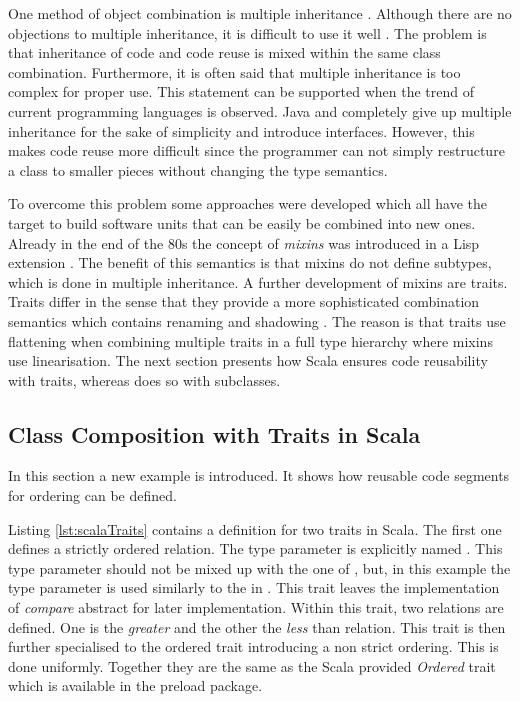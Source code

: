 One method of object combination is multiple inheritance
\cite{taivalsaari_notion_1996}. Although there are no objections
to multiple inheritance, it is difficult to use it well
\cite{wegner_panel_1987}. The problem is that inheritance of code
and code reuse is mixed within the same class combination. Furthermore,
it is often said that multiple inheritance is too complex for proper use.
This statement can be supported when the trend of current programming languages
is observed. Java and \cs completely give up multiple inheritance for
the sake of simplicity and introduce interfaces. However, this makes
code reuse more difficult since the programmer can not simply restructure
a class to smaller pieces without changing the type semantics.

To overcome this problem some approaches were developed which
all have the target to build software units that can be easily be
combined into new ones. Already in the end of the 80s the concept of
\emph{mixins} was introduced
in a Lisp extension \cite{moon_object-oriented_1986}. The benefit
of this semantics is that mixins do not define subtypes, which is
done in multiple inheritance. A further development of mixins are
traits. Traits differ in the sense that they provide a more
sophisticated combination semantics which contains renaming and shadowing
\cite{schaerli_traits:_2003}. The reason is that traits use flattening
when combining multiple traits in a full type hierarchy where mixins
use linearisation. The next section presents how Scala ensures code
reusability with traits, whereas \ooplss does so with subclasses.

\subsection{Class Composition with Traits in Scala}
In this section a new example is introduced. It shows how reusable code
segments for ordering can be defined.

Listing \ref{lst:scalaTraits} contains a definition for two traits in
Scala. The first one defines a strictly ordered relation. The type
parameter is explicitly named \mytype. This type parameter should
not be mixed up with the one of \ooplss, but, in this example the
type parameter is used similarly to the \mytype in \ooplss. This
trait leaves the implementation of \emph{compare} abstract for later
implementation. Within this trait, two relations are defined. One is the
\emph{greater} and the other the \emph{less} than relation. This trait
is then further specialised to the ordered trait introducing a non strict
ordering. This is done uniformly. Together they are the same as the Scala
provided \emph{Ordered} trait which is available in the preload package.

